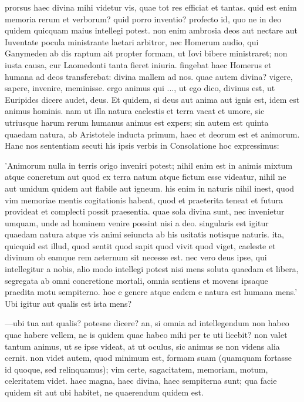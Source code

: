  prorsus haec divina mihi videtur vis, quae tot res efficiat et tantas. quid est enim memoria rerum et verborum? quid porro inventio? profecto id, quo ne in deo quidem quicquam maius intellegi potest. non enim ambrosia deos aut nectare aut Iuventate pocula ministrante laetari arbitror, nec Homerum audio, qui Ganymeden ab dis raptum ait propter formam, ut Iovi bibere ministraret; non iusta causa, cur Laomedonti tanta fieret iniuria. fingebat haec Homerus et humana ad deos transferebat: divina mallem ad nos. quae autem divina? vigere, sapere, invenire, meminisse. ergo animus qui ..., ut ego dico, divinus est, ut Euripides dicere audet, deus. Et quidem, si deus aut anima aut ignis est, idem est animus hominis. nam ut illa natura caelestis et terra vacat et umore, sic utriusque harum rerum humanus animus est expers; sin autem est quinta quaedam natura, ab Aristotele inducta primum, haec et deorum est et animorum. Hanc nos sententiam secuti his ipsis verbis in Consolatione hoc expressimus:

 'Animorum nulla in terris origo inveniri potest; nihil enim est in animis mixtum atque concretum aut quod ex terra natum atque fictum esse videatur, nihil ne aut umidum quidem aut flabile aut igneum. his enim in naturis nihil inest, quod vim memoriae mentis cogitationis habeat, quod et praeterita teneat et futura provideat et complecti possit praesentia. quae sola divina sunt, nec invenietur umquam, unde ad hominem venire possint nisi a deo. singularis est igitur quaedam natura atque vis animi seiuncta ab his usitatis notisque naturis. ita, quicquid est illud, quod sentit quod sapit quod vivit quod viget, caeleste et divinum ob eamque rem aeternum sit necesse est. nec vero deus ipse, qui intellegitur a nobis, alio modo intellegi potest nisi mens soluta quaedam et libera, segregata ab omni concretione mortali, omnia sentiens et movens ipsaque praedita motu sempiterno. hoc e genere atque eadem e natura est humana mens.' Ubi igitur aut qualis est ista mens?

 —ubi tua aut qualis? potesne dicere? an, si omnia ad intellegendum non habeo quae habere vellem, ne is quidem quae habeo mihi per te uti licebit? non valet tantum animus, ut se ipse videat, at ut oculus, sic animus se non videns alia cernit. non videt autem, quod minimum est, formam suam (quamquam fortasse id quoque, sed relinquamus); vim certe, sagacitatem, memoriam, motum, celeritatem videt. haec magna, haec divina, haec sempiterna sunt; qua facie quidem sit aut ubi habitet, ne quaerendum quidem est.

